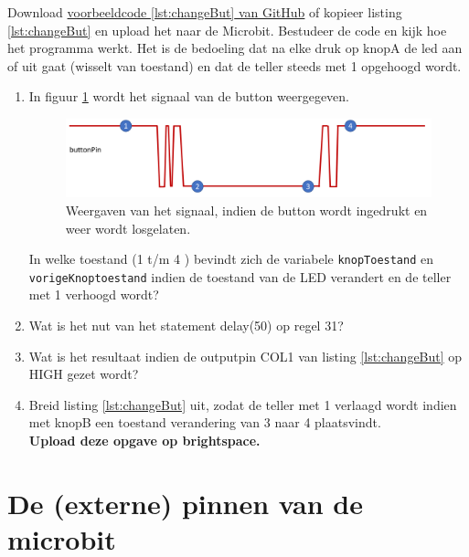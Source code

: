 Download    \href{https://github.com/JohnVi-hhs/embsysP/tree/main/voorbeelden/veranderToestandDrukknop.ino}{voorbeeldcode \ref{lst:changeBut} van GitHub} of kopieer listing \ref{lst:changeBut} en upload het naar de Microbit.
Bestudeer de code en kijk hoe het programma werkt. Het is de bedoeling dat na elke druk op knopA de led aan of uit gaat (wisselt van toestand) en dat de teller steeds met 1 opgehoogd wordt. 
\begin{enumerate}[label=(\Alph*)]
	
	\item In figuur \ref{fig:swToestand} wordt het signaal van de button weergegeven.
	\begin{figure}[h!]
		\captionsetup{justification=centering}
		\includegraphics[width=0.8 \linewidth]{figuren/toestandButtonPin}
		\centering
		\caption{Weergaven van het signaal, indien de button wordt ingedrukt en weer wordt losgelaten.}
		\label{fig:swToestand}
	\end{figure}
	In welke toestand (1 t/m 4 )  bevindt zich de variabele \texttt{knopToestand} en \texttt{vorigeKnoptoestand} indien de toestand van de LED verandert en de teller met 1 verhoogd wordt?
	\item Wat is het nut van het statement \textcolor{arduinoOrange}{delay}(50) op regel 31?\hrulefill
	\item Wat is het resultaat indien de outputpin COL1 van listing \ref{lst:changeBut} op \textcolor{arduinoBlue}{HIGH} gezet wordt?	
	\item Breid listing \ref{lst:changeBut} uit, zodat de teller met 1 verlaagd wordt indien met knopB een toestand verandering van 3 naar 4 plaatsvindt.\\
	\textbf{Upload deze opgave op brightspace.}
	
\end{enumerate}

\section{De (externe) pinnen van de microbit}

